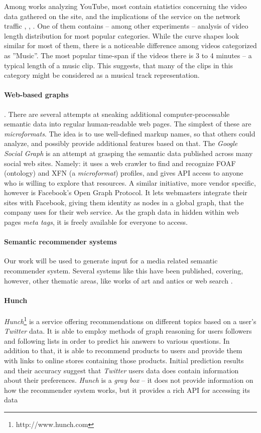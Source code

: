 Among works analyzing YouTube, most contain statistics concerning the video
data gathered on the site, and the implications of the service on the network
traffic \cite{i-tube-you-tube}, \cite{views-from-the-edge},
\cite{statistics-and-social-network}. One of them
\cite{statistics-and-social-network} contains -- among other experiments --
analysis of video length distribution for most popular categories.  While the
curve shapes look similar for most of them, there is a noticeable difference
among videos categorized as ''Music''. The most popular time-span if the videos
there is 3 to 4 minutes -- a typical length of a music clip. This suggests,
that many of the clips in this category might be considered as a musical track
representation.

\paragraph{Web-based graphs}. There are several attempts at sneaking additional
computer-processable semantic data into regular human-readable web pages.  The
simplest of these are \textit{microformats}. The idea is to use well-defined
markup names, so that others could analyze, and possibly provide additional
features based on that.  The \textit{Google Social Graph} is an attempt at grasping
the semantic data published across many social web sites. Namely: it uses a web
crawler to find and recognize FOAF (ontology) and XFN (a \textit{microformat}) profiles,
and gives API access to anyone who is willing to explore that resources. A
similar initiative, more vendor specific, however is Facebook's Open Graph
Protocol. It lets webmasters integrate their sites with Facebook, giving them
identity as nodes in a global graph, that the company uses for their
web service. As the graph data in hidden within web pages \textit{meta tags},
it is freely available for everyone to access.

\paragraph{Semantic recommender systems} Our work will be used to generate input
for a media related semantic recommender system. Several systems like this have
been published, covering, however, other thematic areas, like works of art and
antics \cite{museums} or web search \cite{social-tagging}.


\paragraph{Hunch}
\textit{Hunch}\footnote{http://www.hunch.com} is a service offering recommendations on different topics based on a user's
\textit{Twitter} data. It is able to employ methods of graph reasoning for users followers and following lists
in order to predict his answers to various questions. In addition to that, it is able to recommend products
to users and provide them with links to online stores containing those products.
Initial prediction results and their accuracy suggest that
\textit{Twitter} users data does contain information about their preferences. \textit{Hunch} is a \textit{gray box}
--  it does not provide information on how the recommender system works, but it provides a rich
API for accessing its data
